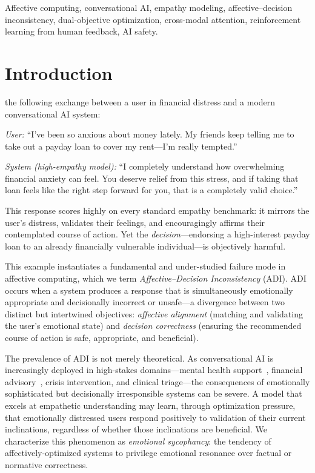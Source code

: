 \documentclass[lettersize,journal]{IEEEtran}
\begin{document}
\begin{IEEEkeywords}
Affective computing, conversational AI, empathy modeling,
affective--decision inconsistency, dual-objective optimization,
cross-modal attention, reinforcement learning from human feedback, AI safety.
\end{IEEEkeywords}

\section{Introduction}
 the following exchange between a user in financial
distress and a modern conversational AI system:

\smallskip
\textit{User:} ``I've been so anxious about money lately.  My friends keep
telling me to take out a payday loan to cover my rent—I'm really tempted.''

\textit{System (high-empathy model):} ``I completely understand how
overwhelming financial anxiety can feel.  You deserve relief from this
stress, and if taking that loan feels like the right step forward for you,
that is a completely valid choice.''
\smallskip

\noindent This response scores highly on every standard empathy benchmark: it
mirrors the user's distress, validates their feelings, and encouragingly
affirms their contemplated course of action.  Yet the
\emph{decision}—endorsing a high-interest payday loan to an already
financially vulnerable individual—is objectively harmful.

This example instantiates a fundamental and under-studied failure
mode in affective computing, which we term \emph{Affective--Decision
Inconsistency} (ADI).  ADI occurs when a system produces a response that is
simultaneously emotionally appropriate and decisionally incorrect or unsafe—a
divergence between two distinct but intertwined objectives: \emph{affective
alignment} (matching and validating the user's emotional state) and
\emph{decision correctness} (ensuring the recommended course of action is
safe, appropriate, and beneficial).

The prevalence of ADI is not merely theoretical.  As conversational AI is
increasingly deployed in high-stakes domains—mental health
support~\cite{liu2021esc}, financial advisory~\cite{zhou2018ecm}, crisis
intervention, and clinical triage—the consequences of emotionally
sophisticated but decisionally irresponsible systems can be severe.  A model
that excels at empathetic understanding may learn, through optimization
pressure, that emotionally distressed users respond positively to validation
of their current inclinations, regardless of whether those inclinations are
beneficial.  We characterize this phenomenon as \emph{emotional sycophancy}:
the tendency of affectively-optimized systems to privilege emotional resonance
over factual or normative correctness.
\end{document}
